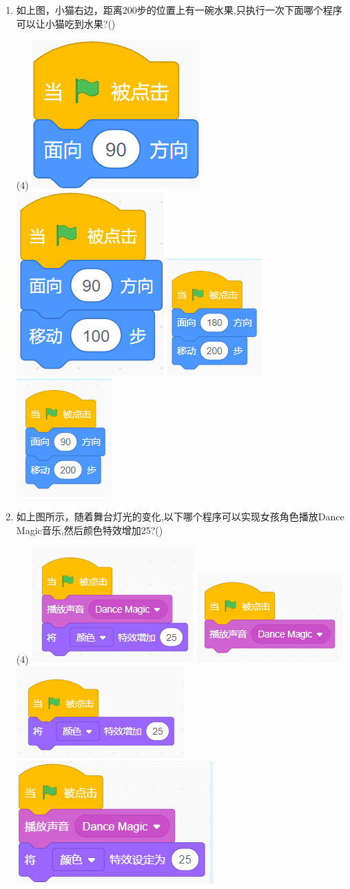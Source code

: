 \documentclass[10pt, a4paper]{article}
\begin{document}
\begin{enumerate}
        \item 如上图，小猫右边，距离200步的位置上有一碗水果,只执行一次下面哪个程序可以让小猫吃到水果?(\qquad)
        \begin{tasks}(4)
            \task \includegraphics[width=.12\textwidth]{9a.png}
            \task \includegraphics[width=.1\textwidth]{9b.png}
            \task \includegraphics[width=.1\textwidth]{9c.png}
            \task \includegraphics[width=.1\textwidth]{9d.png}
        \end{tasks}

       \item 如上图所示，随着舞台灯光的变化,以下哪个程序可以实现女孩角色播放Dance Magic音乐,然后颜色特效增加25?(\qquad)
        \begin{tasks}(4)
            \task \includegraphics[width=.15\textwidth]{10a.png}
            \task \includegraphics[width=.15\textwidth]{10b.png}
            \task \includegraphics[width=.15\textwidth]{10c.png}
            \task \includegraphics[width=.15\textwidth]{10d.png}
        \end{tasks}


\end{enumerate}
\end{document}
